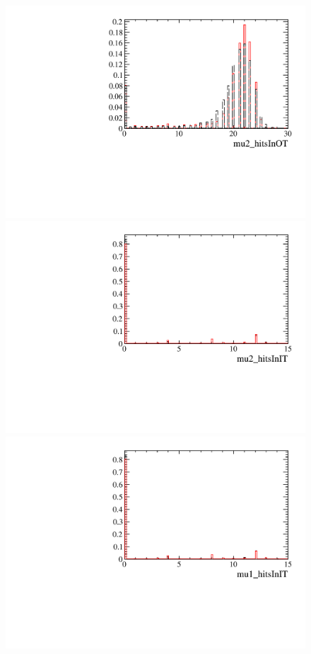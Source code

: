 \begin{figure} [htb!]
\begin{center}
\includegraphics[scale=0.20]{figs/mu2_hitsInOTPARTIALptcut.pdf}
\includegraphics[scale=0.20]{figs/mu2_hitsInITPARTIALptcut.pdf}
\includegraphics[scale=0.20]{figs/mu1_hitsInITPARTIALptcut.pdf}

\end{center}
\end{figure}
